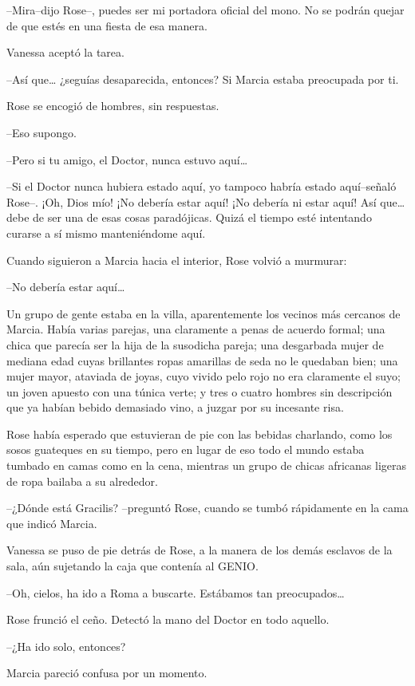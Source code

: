 --Mira--dijo Rose--, puedes ser mi portadora oficial del mono. No se
podrán quejar de que estés en una fiesta de esa manera.

Vanessa aceptó la tarea.

--Así que\ldots{} ¿seguías desaparecida, entonces? Si Marcia estaba
preocupada por ti.

Rose se encogió de hombres, sin respuestas.

--Eso supongo.

--Pero si tu amigo, el Doctor, nunca estuvo aquí\ldots{}

--Si el Doctor nunca hubiera estado aquí, yo tampoco habría estado
aquí--señaló Rose--. ¡Oh, Dios mío! ¡No debería estar aquí! ¡No debería
ni estar aquí! Así que\ldots{} debe de ser una de esas cosas
paradójicas. Quizá el tiempo esté intentando curarse a sí mismo
manteniéndome aquí.

Cuando siguieron a Marcia hacia el interior, Rose volvió a murmurar:

--No debería estar aquí\ldots{}

Un grupo de gente estaba en la villa, aparentemente los vecinos más
cercanos de Marcia. Había varias parejas, una claramente a penas de
acuerdo formal; una chica que parecía ser la hija de la susodicha
pareja; una desgarbada mujer de mediana edad cuyas brillantes ropas
amarillas de seda no le quedaban bien; una mujer mayor, ataviada de
joyas, cuyo vivido pelo rojo no era claramente el suyo; un joven apuesto
con una túnica verte; y tres o cuatro hombres sin descripción que ya
habían bebido demasiado vino, a juzgar por su incesante risa.

Rose había esperado que estuvieran de pie con las bebidas charlando,
como los sosos guateques en su tiempo, pero en lugar de eso todo el
mundo estaba tumbado en camas como en la cena, mientras un grupo de
chicas africanas ligeras de ropa bailaba a su alrededor.

--¿Dónde está Gracilis? --preguntó Rose, cuando se tumbó rápidamente en
la cama que indicó Marcia.

Vanessa se puso de pie detrás de Rose, a la manera de los demás esclavos
de la sala, aún sujetando la caja que contenía al GENIO.

--Oh, cielos, ha ido a Roma a buscarte. Estábamos tan
preocupados\ldots{}

Rose frunció el ceño. Detectó la mano del Doctor en todo aquello.

--¿Ha ido solo, entonces?

Marcia pareció confusa por un momento.

